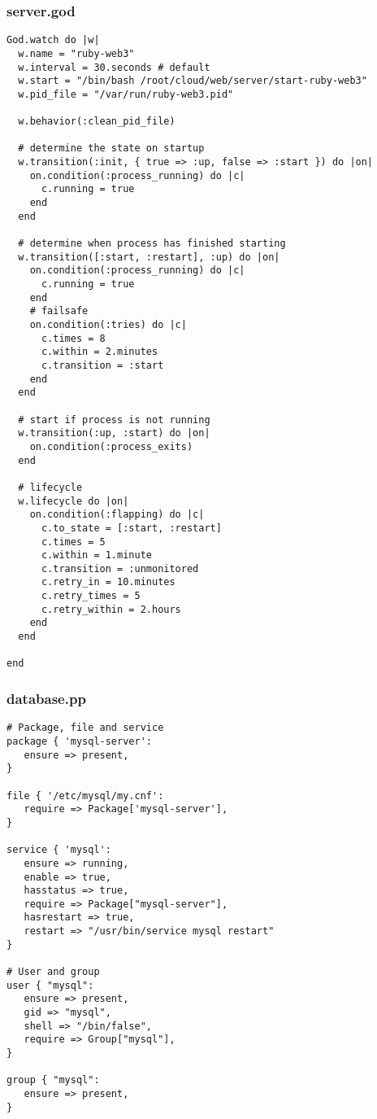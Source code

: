 \subsubsection{server.god}


\begin{lstlisting}
God.watch do |w|
  w.name = "ruby-web3"
  w.interval = 30.seconds # default      
  w.start = "/bin/bash /root/cloud/web/server/start-ruby-web3"
  w.pid_file = "/var/run/ruby-web3.pid"
    
  w.behavior(:clean_pid_file)
  
  # determine the state on startup    
  w.transition(:init, { true => :up, false => :start }) do |on|      
    on.condition(:process_running) do |c|        
      c.running = true     
    end    
  end     

  # determine when process has finished starting    
  w.transition([:start, :restart], :up) do |on|      
    on.condition(:process_running) do |c|        
      c.running = true      
    end       
    # failsafe      
    on.condition(:tries) do |c|        
      c.times = 8        
      c.within = 2.minutes        
      c.transition = :start      
    end    
  end     

  # start if process is not running    
  w.transition(:up, :start) do |on|      
    on.condition(:process_exits)    
  end     

  # lifecycle    
  w.lifecycle do |on|      
    on.condition(:flapping) do |c|        
      c.to_state = [:start, :restart]        
      c.times = 5        
      c.within = 1.minute        
      c.transition = :unmonitored        
      c.retry_in = 10.minutes        
      c.retry_times = 5        
      c.retry_within = 2.hours      
    end    
  end
  
end
\end{lstlisting}


\subsubsection{database.pp}


\begin{lstlisting}
# Package, file and service
package { 'mysql-server':
   ensure => present,
}

file { '/etc/mysql/my.cnf':
   require => Package['mysql-server'],
}

service { 'mysql':
   ensure => running,
   enable => true,
   hasstatus => true,
   require => Package["mysql-server"],
   hasrestart => true,
   restart => "/usr/bin/service mysql restart"
}

# User and group
user { "mysql":
   ensure => present,
   gid => "mysql",
   shell => "/bin/false",
   require => Group["mysql"],
}

group { "mysql":
   ensure => present,
}
\end{lstlisting}


